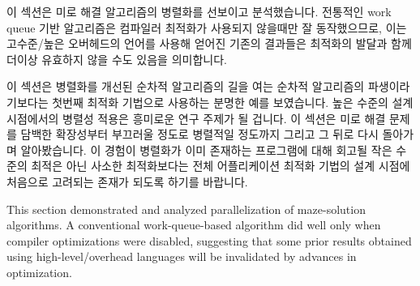 이 섹션은 미로 해결 알고리즘의 병렬화를 선보이고 분석했습니다.
전통적인 work queue 기반 알고리즘은 컴파일러 최적화가 사용되지 않을때만 잘
동작했으므로, 이는 고수준/높은 오버헤드의 언어를 사용해 얻어진 기존의 결과들은
최적화의 발달과 함께 더이상 유효하지 않을 수도 있음을 의미합니다.

이 섹션은 병렬화를 개선된 순차적 알고리즘의 길을 여는 순차적 알고리즘의
파생이라기보다는 첫번째 최적화 기법으로 사용하는 분명한 예를 보였습니다.
높은 수준의 설계 시점에서의 병렬성 적용은 흥미로운 연구 주제가 될 겁니다.
이 섹션은 미로 해결 문제를 담백한 확장성부터 부끄러울 정도로 병렬적일 정도까지
그리고 그 뒤로 다시 돌아가며 알아봤습니다.
이 경험이 병렬화가 이미 존재하는 프로그램에 대해 회고될 작은 수준의 최적은 아닌
사소한 최적화보다는 전체 어플리케이션 최적화 기법의 설계 시점에 처음으로
고려되는 존재가 되도록 하기를 바랍니다.

\iffalse

This section demonstrated and analyzed parallelization of maze-solution
algorithms.
A conventional work-queue-based algorithm did well only when compiler
optimizations were disabled, suggesting that some prior results obtained
using high-level/overhead languages will be invalidated
by advances in optimization.

